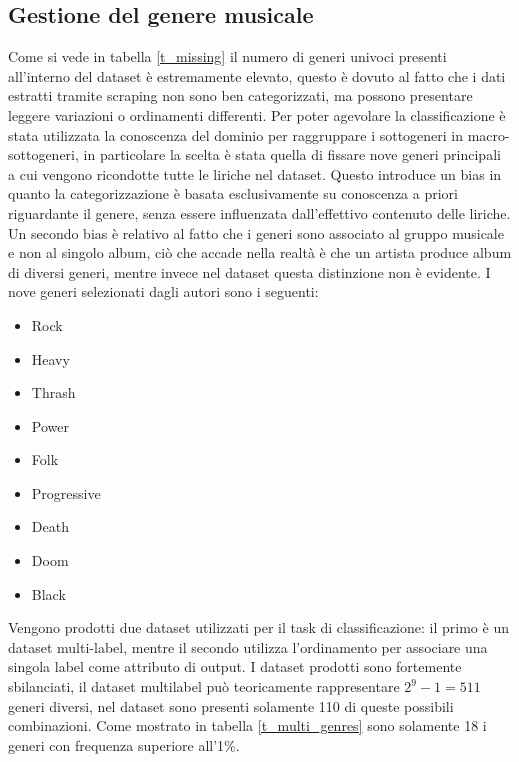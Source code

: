 \documentclass[technote]{IEEEtran}
\begin{document}
\subsection{Gestione del genere musicale}
Come si vede in tabella \ref{t_missing} il numero di generi univoci presenti
all'interno del dataset è estremamente elevato, questo è dovuto al fatto che i dati
estratti tramite scraping non sono ben categorizzati, ma possono presentare
leggere variazioni o ordinamenti differenti.
Per poter agevolare la classificazione è stata utilizzata la
conoscenza del dominio per raggruppare i sottogeneri in macro-sottogeneri,
in particolare la scelta è stata quella di fissare nove generi principali
a cui vengono ricondotte tutte le liriche nel dataset. Questo introduce
un bias in quanto la categorizzazione è basata esclusivamente
su conoscenza a priori riguardante il genere, senza essere influenzata
dall'effettivo contenuto delle liriche.
Un secondo bias è relativo al fatto che i generi sono associato al
gruppo musicale e non al singolo album, ciò che accade nella realtà è
che un artista produce album di diversi generi, mentre invece nel dataset
questa distinzione non è evidente.
I nove generi selezionati dagli autori sono i seguenti:
\begin{itemize}
\item Rock
\item Heavy
\item Thrash
\item Power
\item Folk
\item Progressive
\item Death
\item Doom
\item Black
\end{itemize}
Vengono prodotti due dataset utilizzati per il task di classificazione:
il primo è un dataset multi-label, mentre il secondo utilizza l'ordinamento
per associare una singola label come attributo di output.
I dataset prodotti sono fortemente sbilanciati, il dataset
multilabel può teoricamente rappresentare $ 2^9 - 1 = 511 $ generi
diversi, nel dataset sono presenti solamente 110 di queste
possibili combinazioni. Come mostrato in tabella \ref{t_multi_genres} sono
solamente 18 i generi con frequenza superiore all'1\%.
\end{document}
